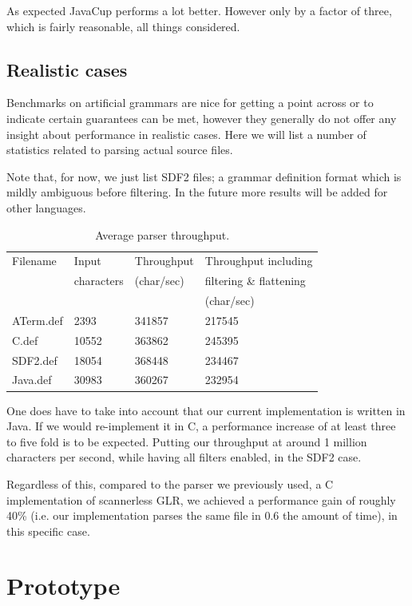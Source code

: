 \documentclass[a4paper,10pt]{article}
\begin{document}
As expected JavaCup performs a lot better. However only by a factor of three, which is fairly reasonable, all things considered.

\subsection{Realistic cases}

Benchmarks on artificial grammars are nice for getting a point across or to indicate certain guarantees can be met, however they generally do not offer any insight about performance in realistic cases. Here we will list a number of statistics related to parsing actual source files.

Note that, for now, we just list SDF2 files; a grammar definition format which is mildly ambiguous before filtering. In the future more results will be added for other languages.

\begin{table}[H]
\centering
\begin{tabular}{ | p{5em} | p{5em} | p{6em} | p{10em} |}
  \hline
  Filename & Input & Throughput & Throughput including\\
   & characters & (char/sec) & filtering \& flattening\\
   & & & (char/sec)\\
  \hline
  ATerm.def & 2393 & 341857 & 217545\\
  C.def & 10552 & 363862 & 245395\\
  SDF2.def & 18054 & 368448 & 234467\\
  Java.def & 30983 & 360267 & 232954\\
  \hline
\end{tabular}
\caption{Average parser throughput.}
\end{table}

One does have to take into account that our current implementation is written in Java. If we would re-implement it in C, a performance increase of at least three to five fold is to be expected. Putting our throughput at around 1 million characters per second, while having all filters enabled, in the SDF2 case.

Regardless of this, compared to the parser we previously used, a C implementation of scannerless GLR, we achieved a performance gain of roughly 40\% (i.e. our implementation parses the same file in 0.6 the amount of time), in this specific case.

\section{Prototype}
\end{document}

